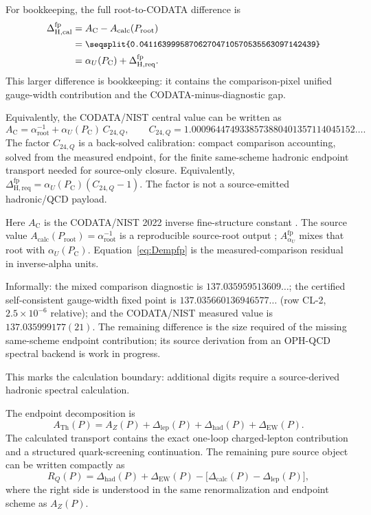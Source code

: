 \documentclass[11pt]{article}
\theoremstyle{remark}
\newcommand{\ATh}{A_{\mathrm{Th}}}
\newcommand{\AZ}{A_Z}
\newcommand{\Ppub}{P_{\mathrm C}}
\newcommand{\Rq}{R_Q}
\newcommand{\Dcalc}{\Delta_{\mathrm{calc}}}
\newcommand{\Dcalib}{\Delta_{\mathrm{H,cal}}}
\newcommand{\Dlep}{\Delta_{\mathrm{lep}}}
\newcommand{\Dhad}{\Delta_{\mathrm{had}}}
\newcommand{\DEW}{\Delta_{\mathrm{EW}}}
\newcommand{\Dhadreq}{\Delta_{\mathrm{H,req}}}
\newcommand{\decnum}[1]{\vcenter{\hbox{\parbox{0.68\linewidth}{\small\ttfamily\seqsplit{#1}}}}}
\begin{document}
For bookkeeping, the full root-to-CODATA difference is
\begin{align}
\Dcalib^{\mathrm{fp}}
&=
A_{\mathrm C}-A_{\mathrm{calc}}(P_{\mathrm{root}})
\nonumber\\
&=
\decnum{0.041163999587062704710570535563097142439}
\nonumber\\
&=
\alpha_U(\Ppub)+\Dhadreq^{\mathrm{fp}}.
\label{eq:rootcodatafp}
\end{align}
This larger difference is bookkeeping: it contains the comparison-pixel unified gauge-width
contribution and the CODATA-minus-diagnostic gap.

Equivalently, the CODATA/NIST central value can be written as
\begin{equation}
A_{\mathrm C}
=
\alpha_{\mathrm{root}}^{-1}+\alpha_U(\Ppub)\,C_{24,Q},
\qquad
C_{24,Q}=1.0009644749338573880401357114045152\ldots.
\label{eq:c24qfactor}
\end{equation}
The factor \(C_{24,Q}\) is a back-solved calibration: compact comparison
accounting, solved from the measured endpoint, for the finite same-scheme hadronic endpoint
transport needed for source-only closure. Equivalently,
\(\Dhadreq^{\mathrm{fp}}=\alpha_U(\Ppub)(C_{24,Q}-1)\). The factor is not a source-emitted
hadronic/QCD payload.

Here \(A_{\mathrm C}\) is the CODATA/NIST 2022 inverse fine-structure constant \cite{nist-value,nist-2022}. The source value \(A_{\mathrm{calc}}(P_{\mathrm{root}})=\alpha_{\mathrm{root}}^{-1}\) is a reproducible source-root output \cite{oph-code}; \(A_{\alpha_U}^{\mathrm{fp}}\) mixes that root with \(\alpha_U(\Ppub)\). Equation~\eqref{eq:Dempfp} is the measured-comparison residual in inverse-alpha units.

Informally: the mixed comparison diagnostic is \(137.035959513609\ldots\); the
certified self-consistent gauge-width fixed point is \(137.035660136946577\ldots\) (row CL-2,
\(2.5\times10^{-6}\) relative); and the CODATA/NIST measured value is \(137.035999177(21)\). The
remaining difference is the size required of the missing same-scheme endpoint contribution; its
source derivation from an OPH-QCD spectral backend is work in progress.

This marks the calculation boundary: additional digits require a source-derived hadronic spectral calculation.

The endpoint decomposition is
\begin{equation}
\ATh(P)
=
\AZ(P)+\Dlep(P)+\Dhad(P)+\DEW(P).
\label{eq:ATsplit}
\end{equation}
The calculated transport contains the exact one-loop charged-lepton contribution and a structured quark-screening continuation. The remaining pure source object can be written compactly as
\begin{equation}
\Rq(P)
=
\Dhad(P)+\DEW(P)
-\bigl[\Dcalc(P)-\Dlep(P)\bigr],
\label{eq:RQmeaning}
\end{equation}
where the right side is understood in the same renormalization and endpoint scheme as \(\AZ(P)\).
\end{document}
